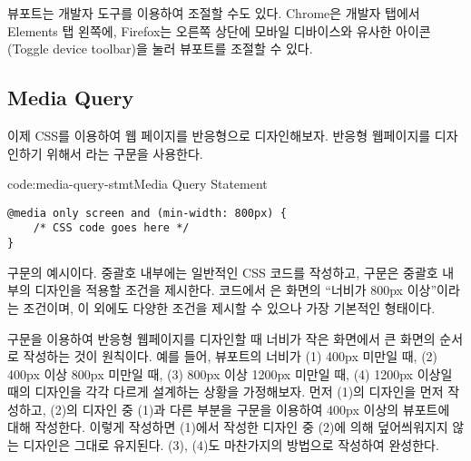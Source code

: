뷰포트는 개발자 도구를 이용하여 조절할 수도 있다. Chrome은 개발자 탭에서 Elements 탭 왼쪽에, Firefox는 오른쪽 상단에 모바일 디바이스와 유사한 아이콘(Toggle device toolbar)을 눌러 뷰포트를 조절할 수 있다.

\subsection*{Media Query}
이제 CSS를 이용하여 웹 페이지를 반응형으로 디자인해보자. 반응형 웹페이지를 디자인하기 위해서 라는 구문을 사용한다.

\begin{codeenv}{code:media-query-stmt}{Media Query Statement}\begin{verbatim}
@media only screen and (min-width: 800px) {
    /* CSS code goes here */
}
\end{verbatim}
\end{codeenv}

\는  구문의 예시이다. 중괄호 내부에는 일반적인 CSS 코드를 작성하고,  구문은 중괄호 내부의 디자인을 적용할 조건을 제시한다. 코드에서 은 화면의 ``너비가 800px 이상''이라는 조건이며, 이 외에도 다양한 조건을 제시할 수 있으나 \가 가장 기본적인 형태이다.

 구문을 이용하여 반응형 웹페이지를 디자인할 때 너비가 작은 화면에서 큰 화면의 순서로 작성하는 것이 원칙이다. 예를 들어, 뷰포트의 너비가 (1) 400px 미만일 때, (2) 400px 이상 800px 미만일 때, (3) 800px 이상 1200px 미만일 때, (4) 1200px 이상일 때의 디자인을 각각 다르게 설계하는 상황을 가정해보자. 먼저 (1)의 디자인을 먼저 작성하고, (2)의 디자인 중 (1)과 다른 부분을  구문을 이용하여 400px 이상의 뷰포트에 대해 작성한다. 이렇게 작성하면 (1)에서 작성한 디자인 중 (2)에 의해 덮어씌워지지 않는 디자인은 그대로 유지된다. (3), (4)도 마찬가지의 방법으로 작성하여 완성한다.
